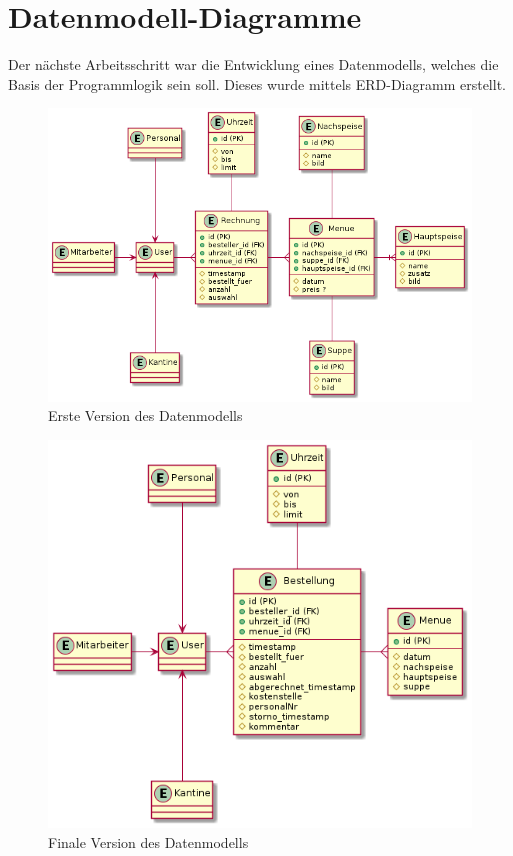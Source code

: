 \section{Datenmodell-Diagramme}
Der nächste Arbeitsschritt war die Entwicklung eines Datenmodells, welches die Basis der Programmlogik sein soll. Dieses wurde mittels ERD-Diagramm erstellt.
\begin{figure}[htp]
    \centering
    \includegraphics[scale=0.5]{pics/erd-alt.png}
    \caption{Erste Version des Datenmodells}
    \label{fig:impl:ERDold}
\end{figure}

\begin{figure}[htp]
    \centering
    \includegraphics[scale=0.5]{pics/erd-aktuell.png}
    \caption{Finale Version des Datenmodells}
    \label{fig:impl:ERDold}
\end{figure}
\pagebreak

